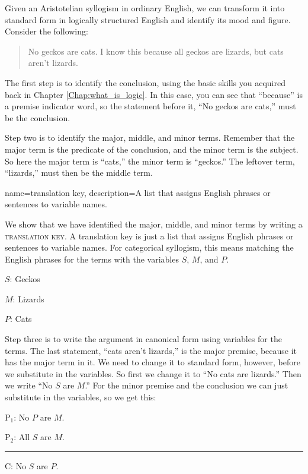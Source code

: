 Given an Aristotelian syllogism in ordinary English, we can transform it into standard form in logically structured English and identify its mood and figure. Consider the following: 

\begin{quotation}
\noindent No geckos are cats. I know this because all geckos are lizards, but cats aren't lizards.
\end{quotation}

The first step is to identify the conclusion, using the basic skills you acquired back in Chapter \ref{Chap:what_is_logic}. In this case, you can see that ``because'' is a premise indicator word, so the statement before it, ``No geckos are cats,'' must be the conclusion.

Step two is to identify the major, middle, and minor terms. Remember that the major term is the predicate of the conclusion, and the minor term is the subject. So here the major term is ``cats,'' the minor term is ``geckos.'' The leftover term, ``lizards,'' must then be the middle term. 


{
name=translation key,
description={A list that assigns English phrases or sentences to variable names.}
}

We show that we have identified the major, middle, and minor terms by writing a \textsc{\gls{translation key}}. \label{def:translation_key} A translation key is just a list that assigns English phrases or sentences to variable names. For categorical syllogism, this means matching the English phrases for the terms with the variables $S$, $M$, and $P$. 

\begin{ekey}
\item[$S$:] Geckos
\item[$M$:] Lizards
\item[$P$:] Cats
\end{ekey}

Step three is to write the argument in canonical form using variables for the terms. The last statement, ``cats aren't lizards,'' is the major premise, because it has the major term in it. We need to change it to standard form, however, before we substitute in the variables. So first we change it to ``No cats are lizards.'' Then we write ``No $S$ are $M$.'' For the minor premise and the conclusion we can just substitute in the variables, so we get this:
 
\begin{earg}
\item[P$_1$:] No $P$ are $M$.
\item[P$_2$:] All $S$ are $M$.
\vspace{-.5em}
\item [] \rule{0.15\linewidth}{.5pt} 
\item[C:] No $S$ are $P$. 
\end{earg} 

